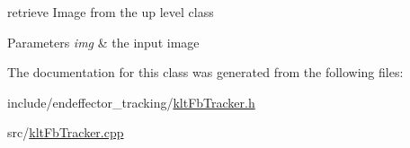 retrieve \-Image from the up level class 


\begin{DoxyParams}{\-Parameters}
{\em img} & the input image \\
\hline
\end{DoxyParams}


\-The documentation for this class was generated from the following files\-:\begin{DoxyCompactItemize}
\item 
include/endeffector\-\_\-tracking/\hyperlink{kltFbTracker_8h}{klt\-Fb\-Tracker.\-h}\item 
src/\hyperlink{kltFbTracker_8cpp}{klt\-Fb\-Tracker.\-cpp}\end{DoxyCompactItemize}
